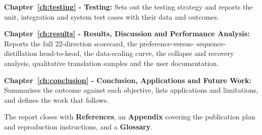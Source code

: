 \textbf{Chapter~\ref{ch:testing} - Testing:} Sets out the testing strategy and
reports the unit, integration and system test cases with their data and
outcomes.

\textbf{Chapter~\ref{ch:results} - Results, Discussion and Performance Analysis:} Reports the full 22-direction scorecard, the preference-versus-%
sequence-distillation head-to-head, the data-scaling curve, the collapse and
recovery analysis, qualitative translation samples and the user documentation.

\textbf{Chapter~\ref{ch:conclusion} - Conclusion, Applications and Future Work:} Summarises the outcome against each objective, lists applications and
limitations, and defines the work that follows.

The report closes with \textbf{References}, an \textbf{Appendix} covering the
publication plan and reproduction instructions, and a \textbf{Glossary}.
